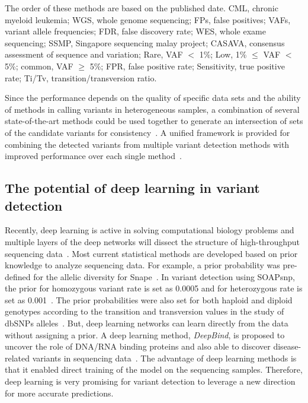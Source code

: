 \documentclass[a4,center,fleqn]{NAR}
\begin{document}
\begin{landscape}
\begin{table}[htbp]
\begin{threeparttable}
\begin{tabular}{rlrr}
    \bottomrule
    \end{tabular}
   \begin{tablenotes}
	\item The order of these methods are based on the published date.
CML, chronic myeloid leukemia;
WGS, whole genome sequencing;
FPs, false positives;
VAFs, variant allele frequencies;
FDR, false discovery rate;
WES, whole exame sequencing;
SSMP, Singapore sequencing malay project;
CASAVA, consensus assessment of sequence and variation;
Rare, VAF $<$ 1\%; Low, 1\% $\leqslant$ VAF $<$  5\%; common, VAF $\geqslant$ 5\%;
FPR, false positive rate;
Sensitivity, true positive rate;
Ti/Tv, transition/transversion ratio.
    \end{tablenotes}
\end{threeparttable}
\end{table}
\end{landscape}


Since the performance depends on the quality of specific data sets and the ability of methods in calling variants in heterogeneous samples, a combination of several state-of-the-art methods could be used together to generate an intersection of sets of the candidate variants for consistency~\citep{liu2013variant}.
A unified framework is provided for combining the detected variants from multiple variant detection methods with improved performance over each single method~\citep{kim2014combining}.


\subsection{The potential of deep learning in variant detection}

Recently, deep learning is active in solving computational biology problems and multiple layers of the deep networks will dissect the structure of high-throughput sequencing data~\citep{angermueller2016deep}.
Most current statistical methods are developed based on prior knowledge to analyze sequencing data.
For example, a prior probability was pre-defined for the allelic diversity for Snape~\citep{Raineri2012}.
In variant detection using SOAPsnp, the prior for homozygous variant rate is set as 0.0005 and for heterozygous rate is set as 0.001~\citep{Li2009}.
The prior probabilities were also set for both haploid and diploid genotypes according to the transition and transversion values in the study of dbSNPs alleles~\citep{zhao2002neighboring}. 
But, deep learning networks can learn directly from the data without assigning a prior.
A deep learning method, \textit{DeepBind}, is proposed to uncover the role of DNA/RNA binding proteins and also able to discover disease-related variants in sequencing data~\citep{alipanahi2015predicting}.
The advantage of deep learning methods is that it enabled direct training of the model on the sequencing samples.
Therefore, deep learning is very promising for variant detection to leverage a new direction for more accurate predictions.
\end{document}
